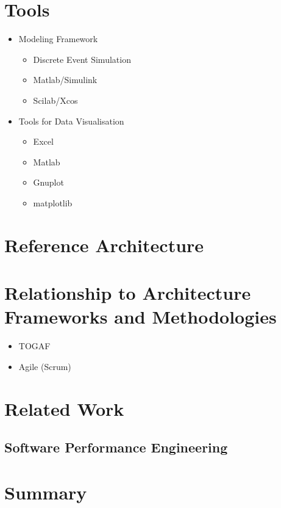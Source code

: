 \section{Tools} %
\label{sec:ch6_tools}

\begin{itemize}
	\item Modeling Framework
	\begin{itemize}
		\item Discrete Event Simulation
		\item Matlab/Simulink
		\item Scilab/Xcos
	\end{itemize}
	\item Tools for Data Visualisation
	\begin{itemize}
		\item Excel
		\item Matlab
		\item Gnuplot
		\item matplotlib
	\end{itemize}
\end{itemize}


\section{Reference Architecture}

\section{Relationship to Architecture Frameworks and Methodologies} %
\label{sec:ch6_relation_frameworks}

\begin{itemize}
	\item TOGAF
	\item Agile (Scrum)
\end{itemize}


\section{Related Work}

\subsection{Software Performance Engineering} %
\label{sub:software_performance_engineering}


\section{Summary} 
